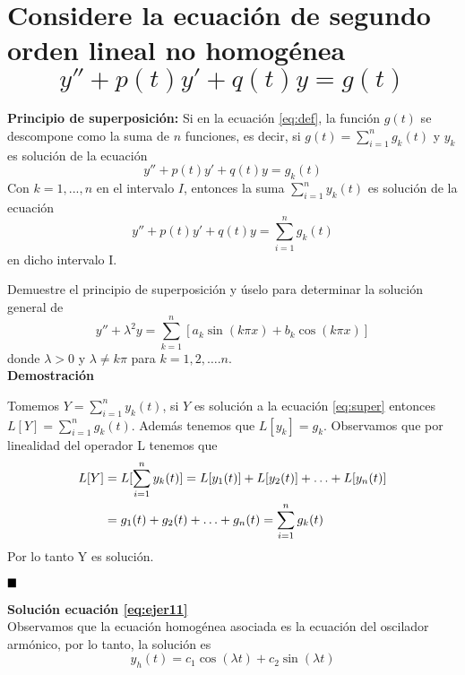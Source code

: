 \section{Considere la ecuación de segundo orden lineal no homogénea
\begin{equation}
y'' +p(t)y' + q(t)y = g(t)
\label{eq:def}
\end{equation}
}
\textbf{Principio de superposición:} Si en la ecuación \ref{eq:def}, la función $g(t)$ se descompone como la suma de $n$ funciones, es decir, si $g(t)= \sum_{i=1}^{n}g_{k}(t)$ y $y_{k}$ es solución de la ecuación 
\begin{equation*}
    y'' +p(t)y' + q(t)y = g_{k}(t)
\end{equation*}
Con $k=1,..., n$ en el intervalo $I$, entonces la suma  $\sum_{i=1}^{n}y_{k}(t)$ es solución de la ecuación 
\begin{equation}
    y'' +p(t)y' + q(t)y = \sum_{i=1}^{n}g_{k}(t)
\label{eq:super}    
\end{equation}
en dicho intervalo I.

Demuestre el principio de superposición y úselo para determinar la solución general de 
\begin{equation}
    y'' + \lambda^{2}y = \sum_{k=1}^{n} \left[ a_{k}\sin{(k\pi x) + b_{k}\cos{(k\pi x)}} \right]
\label{eq:ejer11}    
\end{equation}
donde $\lambda>0$ y $\lambda \neq k \pi$ para $k=1,2, \ldots . n$.\\

\textbf{Demostración}

Tomemos $Y=\sum_{i=1}^{n}y_{k}(t)$, si  $Y$ es solución a la ecuación \ref{eq:super} entonces $L[Y]=\sum_{i=1}^{n}g_{k}(t)$. Además tenemos que $L[y_{k}]= g_{k}$. Observamos que por linealidad del operador L tenemos que
\begin{equation*}
\centering
    \begin{split}
        L[Y]&= L[\sum_{i=1}^{n}y_{k}(t)] 
        =L[y_{1}(t)]+L[y_{2}(t)]+\ldots+L[y_{n}(t)] \\
        &=g_{1}(t) + g_{2}(t) + \ldots + g_{n}(t) 
        = \sum_{i=1}^{n}g_{k}(t)
    \end{split}
\end{equation*}
Por lo tanto Y es solución.

$\hfill \blacksquare$

\textbf{Solución ecuación \ref{eq:ejer11}} \\
Observamos que la ecuación homogénea asociada es la ecuación del oscilador armónico, por lo tanto, la solución es 
$$
y_{h}(t)=c_{1} \cos (\lambda t)+c_{2} \sin (\lambda t)
$$\\

